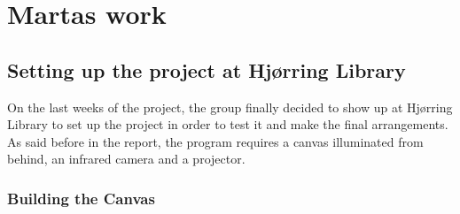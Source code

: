 \chapter{Martas work}

\section{Setting up the project at Hj{\o}rring Library}
On the last weeks of the project, the group finally decided to show up at Hj{\o}rring Library to set up the project in order to test it and make the final arrangements. As said before in the report, the program requires a canvas illuminated from behind, an infrared camera and a projector.
\subsection{Building the Canvas}



